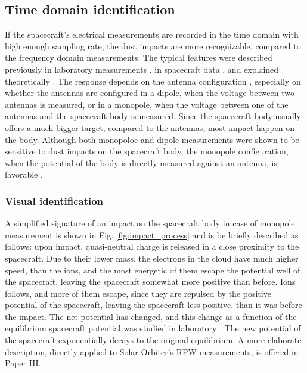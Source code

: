 \subsection{Time domain identification}

If the spacecraft's electrical measurements are recorded in the time domain with high enough sampling rate, the dust impacts are more recognizable, compared to the frequency domain measurements. The typical features were described previously in laboratory measurements \citep{auer1968,nouzak2018laboratory,shen2021electrostatic,shen2023variability}, in spacecraft data \citep{zaslavsky2012interplanetary,kellogg2016dust,vaverka2021ion}, and explained theoretically \citep{zaslavsky2015floating,meyer2017frequency,babic2022analytical}. The response depends on the antenna configuration \citep{shen2023variability,vaverka2021ion}, especially on whether the antennas are configured in a dipole, when the voltage between two antennas is measured, or in a monopole, when the voltage between one of the antennas and the spacecraft body is measured. Since the spacecraft body usually offers a much bigger target, compared to the antennas, most impact happen on the body. Although both monopoloe and dipole measurements were shown to be sensitive to dust impacts on the spacecraft body, the monopole configuration, when the potential of the body is directly measured against an antenna, is favorable \citep{meyer2014importance,mann2019dust}. 

\subsubsection{Visual identification}

A simplified signature of an impact on the spacecraft body in case of monopole measurement is shown in Fig. \ref{fig:impact_process} and is be briefly described as follows: upon impact, quasi-neutral charge is released in a close proximity to the spacecraft. Due to their lower mass, the electrons in the cloud have much higher speed, than the ions, and the most energetic of them escape the potential well of the spacecraft, leaving the spacecraft somewhat more positive than before. Ions follows, and more of them escape, since they are repulsed by the positive potential of the spacecraft, leaving the spacecraft less positive, than it was before the impact. The net potential has changed, and this change as a function of the equilibrium spacecraft potential was studied in laboratory \citep{collette2016characteristic,kovcivsvcak2020effective}. The new potential of the spacecraft exponentially decays to the original equilibrium. A more elaborate description, directly applied to Solar Orbiter's RPW measurements, is offered in Paper III.

